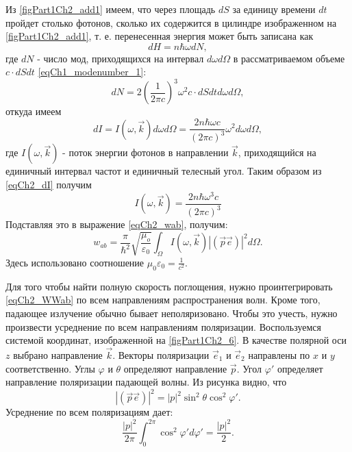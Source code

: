 Из \autoref{figPart1Ch2_add1} имеем, что через площадь $dS$ за единицу
времени $dt$ пройдет столько фотонов, сколько их содержится в цилиндре
изображенном на \autoref{figPart1Ch2_add1}, т. е. перенесенная
энергия может быть записана как
\[
dH = n \hbar \omega d N ,
\]
где $dN$ -  число мод, приходящихся на интервал $d \omega d \Omega$ в
 рассматриваемом объеме $c \cdot dS  dt$ \eqref{eqCh1_modenumber_1}:
\[
d N = 2 \left(\frac{1}{2 \pi c} \right)^3 \omega^2 
c \cdot dS  dt
d \omega d \Omega,
\]
откуда имеем 
\begin{equation}
d I = I\left(\omega, \vec{k}\right) d \omega d \Omega = 
\frac{2 n \hbar \omega c}{\left(2 \pi c\right)^3}
\omega^2 d \omega d \Omega,
\label{eqCh2_dI}
\end{equation}
где $I\left(\omega, \vec{k}\right)$ - 
поток энергии фотонов в направлении $\vec{k}$,  приходящийся на единичный
интервал частот и единичный телесный угол. Таким образом из
\eqref{eqCh2_dI} получим 
\begin{equation}
I\left(\omega, \vec{k}\right) = 
\frac{2 n \hbar \omega^3 c}{\left(2 \pi c\right)^3}
\nonumber
\end{equation}
Подставляя это в выражение \eqref{eqCh2_wab}, получим:
\begin{equation}
w_{ab} = \frac{\pi}{\hbar^2}\sqrt{\frac{\mu_o}{\varepsilon_0}}
\int_{\Omega}I\left(\omega, \vec{k}\right)
\left|\left(\vec{p} \vec{e}\right)\right|^2
d \Omega.
\label{eqCh2_WWab}
\end{equation}
Здесь использовано соотношение $\mu_0 \varepsilon_0 = \frac{1}{c^2}$.



Для того чтобы найти полную скорость поглощения, нужно
проинтегрировать \eqref{eqCh2_WWab} по всем направлениям
распространения волн. Кроме того, падающее излучение обычно бывает 
неполяризовано. Чтобы это учесть, нужно произвести усреднение
по всем направлениям поляризации. Воспользуемся системой
координат, изображенной на \autoref{figPart1Ch2_6}. В качестве полярной оси $z$
выбрано направление $\vec{k}$.  Векторы поляризации $\vec{e}_1$ и $\vec{e}_2$ направлены по $x$ и $y$ соответственно.
Углы $\varphi$ и $\theta$   определяют направление $\vec{p}$. 
Угол $\varphi'$ определяет направление поляризации падающей
волны. Из рисунка видно, что
\[
\left|\left(\vec{p} \vec{e}\right)\right|^2 = 
\left|p\right|^2 \sin^2 \theta \cos^2 \varphi'. 
\]
Усреднение по всем поляризациям дает: 
\begin{equation}
\frac{\left|p\right|^2}{2 \pi} \int_0^{2 \pi}
\cos^2 \varphi' d \varphi' = \frac{\left|p\right|^2}{2}.
\label{eqCh2_PolyarMedian}
\end{equation}

